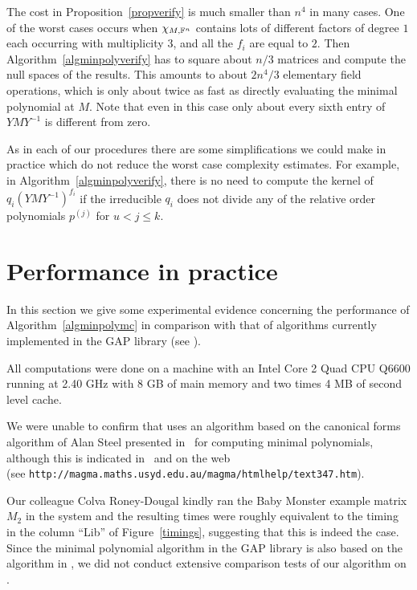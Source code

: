 \begin{Rem}
The cost in Proposition~\ref{propverify} is much smaller than $n^4$ in
many cases. One of the worst cases occurs when $\chi_{M,\mathbb{F}^n}$ contains lots of
different factors of degree $1$ each occurring with multiplicity $3$, and 
all the $f_i$ are equal to $2$. Then Algorithm~\ref{algminpolyverify} has to
square about $n/3$ matrices and compute the null spaces of the results. 
This amounts to about
$2n^4/3$ elementary field operations, which is only about twice as fast as 
directly evaluating the minimal polynomial at $M$. Note that even in this case
only about every sixth entry of\/ $YMY^{-1}$ is different from zero. 
\end{Rem}

\begin{Rem}
 As in each of our procedures there are some simplifications we could make in practice
which do not reduce the worst case complexity estimates. For example, in Algorithm~\ref{algminpolyverify}, there is no need to compute the kernel of $q_i(YMY^{-1})^{f_i}$ if the irreducible $q_i$ does not divide any of the relative order polynomials $p^{(j)}$ for $u<j\leq k$. 
\end{Rem}



\section{Performance in practice}
\label{performance}

In this section we give some experimental evidence concerning 
the performance of Algorithm~\ref{algminpolymc} in comparison with 
that of algorithms currently implemented in the
{\sf GAP} library (see \cite{GAP4}). 

All computations were done on a machine with an Intel Core 2 Quad CPU Q6600
running at 2.40 GHz with 8 GB of main memory and two times 4 MB of second level
cache. 

We were unable to confirm that {\MAGMA} \cite{Magma} 
uses an algorithm  based on the canonical forms algorithm of Alan
Steel presented in~\cite{Steel} for computing minimal 
polynomials, although this is indicated in~\cite[Abstract]{Steel} and on the
web\\ %
(see \texttt{http://magma.maths.usyd.edu.au/magma/htmlhelp/text347.htm}).

Our colleague Colva Roney-Dougal kindly
ran the Baby Monster example matrix $M_2$ in the {\MAGMA} system and the resulting
times were roughly equivalent to the timing in the column ``Lib'' of
Figure~\ref{timings}, suggesting that this is indeed the case. Since the
minimal polynomial algorithm in the {\sf GAP} library is also based on 
the algorithm in \cite{Steel}, we did not conduct extensive comparison tests of our
algorithm on {\MAGMA}.

